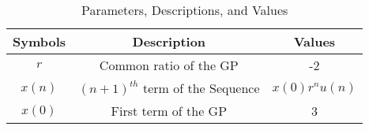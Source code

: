 \begin{table}[ht!]
\centering
\begin{tabular}{ |c|c|c| } 
 \hline
Symbols & Description & Values  \\
\hline
 $r$ & Common ratio of the GP & -2\\
 \hline
 $x(n)$ & $(n+1)^{th}$ term of the Sequence & $x(0)r^{n}u(n)$\\
 \hline
 $x(0)$ & First term of the GP & 3\\
\hline
\end{tabular}
\caption{Parameters, Descriptions, and Values}
\label{table:ee25-tab2}
\end{table}




